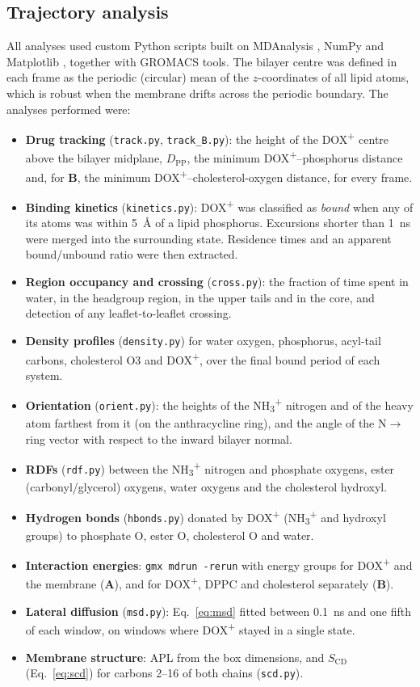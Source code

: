 \documentclass[11pt,a4paper]{article}
\newcommand{\dox}{DOX\textsuperscript{+}}
\newcommand{\nhthree}{NH\textsubscript{3}\textsuperscript{+}}
\newcommand{\scd}{S_{\mathrm{CD}}}
\newcommand{\sysA}{\textcolor{sysA}{\textbf{A}}}
\newcommand{\sysB}{\textcolor{sysB}{\textbf{B}}}
\begin{document}
\subsection{Trajectory analysis}
All analyses used custom Python scripts built on MDAnalysis \cite{michaudagrawal2011,gowers2016}, NumPy
and Matplotlib \cite{hunter2007}, together with GROMACS tools. The bilayer centre was defined in each
frame as the periodic (circular) mean of the $z$-coordinates of all lipid atoms, which is robust when the
membrane drifts across the periodic boundary. The analyses performed were:
\begin{itemize}
  \item \textbf{Drug tracking} (\texttt{track.py}, \texttt{track\_B.py}): the height of the \dox{}
        centre above the bilayer midplane, $D_\mathrm{PP}$, the minimum \dox{}--phosphorus distance and,
        for \sysB{}, the minimum \dox{}--cholesterol-oxygen distance, for every frame.
  \item \textbf{Binding kinetics} (\texttt{kinetics.py}): \dox{} was classified as \emph{bound} when
        any of its atoms was within \SI{5}{\angstrom} of a lipid phosphorus. Excursions shorter than
        \SI{1}{ns} were merged into the surrounding state. Residence times and an apparent
        bound/unbound ratio were then extracted.
  \item \textbf{Region occupancy and crossing} (\texttt{cross.py}): the fraction of time spent in water,
        in the headgroup region, in the upper tails and in the core, and detection of any leaflet-to-leaflet
        crossing.
  \item \textbf{Density profiles} (\texttt{density.py}) for water oxygen, phosphorus, acyl-tail carbons,
        cholesterol O3 and \dox{}, over the final bound period of each system.
  \item \textbf{Orientation} (\texttt{orient.py}): the heights of the \nhthree{} nitrogen and of the
        heavy atom farthest from it (on the anthracycline ring), and the angle of the N$\to$ring vector
        with respect to the inward bilayer normal.
  \item \textbf{RDFs} (\texttt{rdf.py}) between the \nhthree{} nitrogen and phosphate oxygens, ester
        (carbonyl/glycerol) oxygens, water oxygens and the cholesterol hydroxyl.
  \item \textbf{Hydrogen bonds} (\texttt{hbonds.py}) donated by \dox{} (\nhthree{} and hydroxyl groups) to
        phosphate O, ester O, cholesterol O and water.
  \item \textbf{Interaction energies}: \texttt{gmx mdrun -rerun} with energy groups for \dox{} and the membrane
        (\sysA), and for \dox{}, DPPC and cholesterol separately (\sysB).
  \item \textbf{Lateral diffusion} (\texttt{msd.py}): Eq.~\eqref{eq:msd} fitted between \SI{0.1}{ns} and
        one fifth of each window, on windows where \dox{} stayed in a single state.
  \item \textbf{Membrane structure}: APL from the box dimensions, and $\scd$ (Eq.~\eqref{eq:scd}) for
        carbons 2--16 of both chains (\texttt{scd.py}).
\end{itemize}
\end{document}
